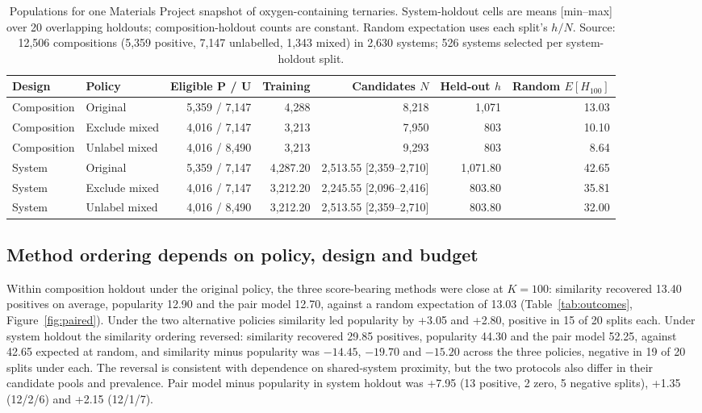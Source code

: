 \documentclass[11pt,a4paper]{article}
\begin{document}
\begin{table}[t]
\centering
\caption{Populations for one Materials Project snapshot of oxygen-containing ternaries. System-holdout cells are means [min--max] over 20 overlapping holdouts; composition-holdout counts are constant. Random expectation uses each split's $h/N$. Source: 12,506 compositions (5,359 positive, 7,147 unlabelled, 1,343 mixed) in 2,630 systems; 526 systems selected per system-holdout split.}
\label{tab:populations}
\footnotesize
\setlength{\tabcolsep}{3.5pt}
\begin{tabular}{llrrrrr}
\toprule
Design & Policy & Eligible P / U & Training & Candidates $N$ & Held-out $h$ & Random $E[H_{100}]$\\
\midrule
Composition & Original & 5,359 / 7,147 & 4,288 & 8,218 & 1,071 & 13.03\\
Composition & Exclude mixed & 4,016 / 7,147 & 3,213 & 7,950 & 803 & 10.10\\
Composition & Unlabel mixed & 4,016 / 8,490 & 3,213 & 9,293 & 803 & 8.64\\
System & Original & 5,359 / 7,147 & 4,287.20 & 2,513.55 [2,359--2,710] & 1,071.80 & 42.65\\
System & Exclude mixed & 4,016 / 7,147 & 3,212.20 & 2,245.55 [2,096--2,416] & 803.80 & 35.81\\
System & Unlabel mixed & 4,016 / 8,490 & 3,212.20 & 2,513.55 [2,359--2,710] & 803.80 & 32.00\\
\bottomrule
\end{tabular}
\end{table}

\subsection{Method ordering depends on policy, design and budget}
Within composition holdout under the original policy, the three score-bearing methods were close at $K=100$: similarity recovered 13.40 positives on average, popularity 12.90 and the pair model 12.70, against a random expectation of 13.03 (Table~\ref{tab:outcomes}, Figure~\ref{fig:paired}). Under the two alternative policies similarity led popularity by +3.05 and +2.80, positive in 15 of 20 splits each. Under system holdout the similarity ordering reversed: similarity recovered 29.85 positives, popularity 44.30 and the pair model 52.25, against 42.65 expected at random, and similarity minus popularity was $-14.45$, $-19.70$ and $-15.20$ across the three policies, negative in 19 of 20 splits under each. The reversal is consistent with dependence on shared-system proximity, but the two protocols also differ in their candidate pools and prevalence. Pair model minus popularity in system holdout was +7.95 (13 positive, 2 zero, 5 negative splits), +1.35 (12/2/6) and +2.15 (12/1/7).
\end{document}
